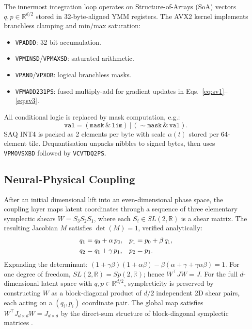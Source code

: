 \documentclass[10pt,twocolumn]{article}
\newcommand{\R}{\mathbb{R}}
\begin{document}
The innermost integration loop operates on Structure-of-Arrays (SoA)
vectors $q,p\in\R^{d/2}$ stored in 32-byte-aligned YMM registers.
The AVX2 kernel implements branchless clamping and min/max saturation:
\begin{itemize}
  \item \texttt{VPADDD}: 32-bit accumulation.
  \item \texttt{VPMINSD}/\texttt{VPMAXSD}: saturated arithmetic.
  \item \texttt{VPAND}/\texttt{VPXOR}: logical branchless masks.
  \item \texttt{VFMADD231PS}: fused multiply-add for gradient
        updates in Eqs.~\eqref{eq:sv1}--\eqref{eq:sv3}.
\end{itemize}
All conditional logic is replaced by mask computation, e.g.:
\begin{equation*}
  \texttt{val} = (\texttt{mask}\,\&\,\texttt{lim})\,|\,
                (\sim\!\texttt{mask}\,\&\,\texttt{val}).
\end{equation*}
SAQ INT4 is packed as 2 elements per byte with scale $\alpha(t)$
stored per 64-element tile. Dequantisation unpacks nibbles to signed bytes,
then uses \texttt{VPMOVSXBD} followed by \texttt{VCVTDQ2PS}.

\subsection{Neural-Physical Coupling}
\label{sec:coupling}

After an initial dimensional lift into an even-dimensional phase space, the
coupling layer maps latent coordinates through a sequence of three elementary
symplectic shears
$W = S_3 S_2 S_1$, where each
$S_i \in SL(2,\R)$ is a shear matrix.
The resulting Jacobian $M$ satisfies $\det(M)=1$, verified analytically:
\begin{align}
  q_1 &= q_0 + \alpha\,p_0,
  & p_1 &= p_0 + \beta\,q_1, \notag\\
  q_2 &= q_1 + \gamma\,p_1,
  & p_2 &= p_1. \notag
\end{align}
Expanding the determinant:
$(1+\gamma\beta)(1+\alpha\beta) - \beta(\alpha+\gamma+\gamma\alpha\beta) = 1$.
For one degree of freedom, $SL(2,\R)=Sp(2,\R)$; hence
$W^{\top}JW = J$.
For the full $d$-dimensional latent space with $q, p \in \mathbb{R}^{d/2}$,
symplecticity is preserved by constructing $W$ as a block-diagonal
product of $d/2$ independent 2D shear pairs, each acting on a
$(q_i, p_i)$ coordinate pair. The global map satisfies
$W^\top J_{d \times d} W = J_{d \times d}$ by the direct-sum
structure of block-diagonal symplectic matrices \cite{hairer2006geometric}.
\end{document}
